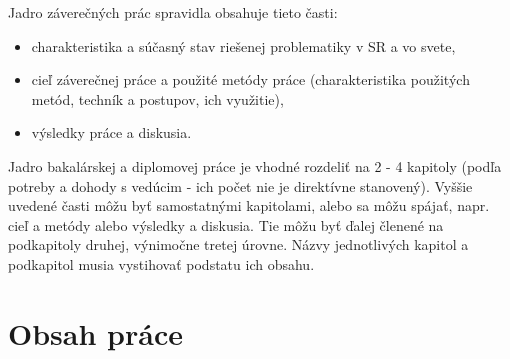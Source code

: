 Jadro záverečných prác spravidla obsahuje tieto časti:
\begin{itemize}
\item  charakteristika a súčasný stav riešenej problematiky v SR a vo svete,
\end{itemize}
\begin{itemize}
\item  cieľ záverečnej práce a použité metódy práce (charakteristika použitých metód, techník a postupov, ich využitie),
\end{itemize}
\begin{itemize}
\item  výsledky práce a diskusia.
\end{itemize}

Jadro bakalárskej a diplomovej práce je vhodné rozdeliť na 2 - 4 kapitoly (podľa potreby a dohody s vedúcim - ich počet nie je direktívne stanovený). Vyššie uvedené časti môžu byť samostatnými kapitolami, alebo sa môžu spájať, napr. cieľ a metódy alebo výsledky a diskusia. Tie môžu byť ďalej členené na podkapitoly druhej, výnimočne tretej úrovne. Názvy jednotlivých kapitol a podkapitol musia vystihovať podstatu ich obsahu.

\section{Obsah práce}

